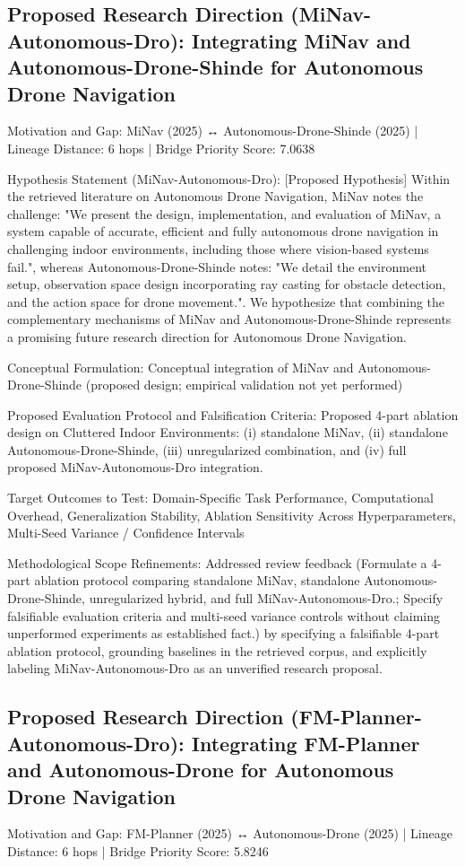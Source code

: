 \documentclass[10pt,twocolumn,letterpaper]{article}
\begin{document}
\subsection{Proposed Research Direction (MiNav-Autonomous-Dro): Integrating MiNav and Autonomous-Drone-Shinde for Autonomous Drone Navigation}
Motivation and Gap: MiNav (2025) ↔ Autonomous-Drone-Shinde (2025) | Lineage Distance: 6 hops | Bridge Priority Score: 7.0638

Hypothesis Statement (MiNav-Autonomous-Dro): [Proposed Hypothesis] Within the retrieved literature on Autonomous Drone Navigation, MiNav notes the challenge: "We present the design, implementation, and evaluation of MiNav, a system capable of accurate, efficient and fully autonomous drone navigation in challenging indoor environments, including those where vision-based systems fail.", whereas Autonomous-Drone-Shinde notes: "We detail the environment setup, observation space design incorporating ray casting for obstacle detection, and the action space for drone movement.". We hypothesize that combining the complementary mechanisms of MiNav and Autonomous-Drone-Shinde represents a promising future research direction for Autonomous Drone Navigation.

Conceptual Formulation: Conceptual integration of MiNav and Autonomous-Drone-Shinde (proposed design; empirical validation not yet performed)

Proposed Evaluation Protocol and Falsification Criteria: Proposed 4-part ablation design on Cluttered Indoor Environments: (i) standalone MiNav, (ii) standalone Autonomous-Drone-Shinde, (iii) unregularized combination, and (iv) full proposed MiNav-Autonomous-Dro integration.

Target Outcomes to Test: Domain-Specific Task Performance, Computational Overhead, Generalization Stability, Ablation Sensitivity Across Hyperparameters, Multi-Seed Variance / Confidence Intervals

Methodological Scope Refinements: Addressed review feedback (Formulate a 4-part ablation protocol comparing standalone MiNav, standalone Autonomous-Drone-Shinde, unregularized hybrid, and full MiNav-Autonomous-Dro.; Specify falsifiable evaluation criteria and multi-seed variance controls without claiming unperformed experiments as established fact.) by specifying a falsifiable 4-part ablation protocol, grounding baselines in the retrieved corpus, and explicitly labeling MiNav-Autonomous-Dro as an unverified research proposal.

\subsection{Proposed Research Direction (FM-Planner-Autonomous-Dro): Integrating FM-Planner and Autonomous-Drone for Autonomous Drone Navigation}
Motivation and Gap: FM-Planner (2025) ↔ Autonomous-Drone (2025) | Lineage Distance: 6 hops | Bridge Priority Score: 5.8246
\end{document}
